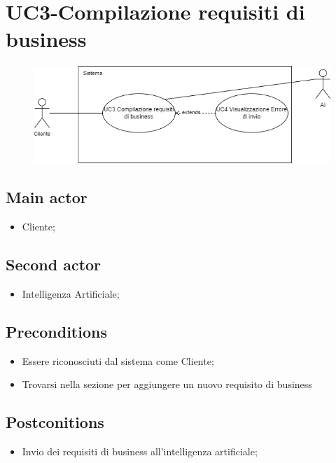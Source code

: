 \documentclass{article}
\begin{document}
    
\section{UC3-Compilazione requisiti di business}
    \begin{figure}[h]
      \centering
      \includegraphics[width=.8\textwidth, height=.6\textheight, keepaspectratio]{./imgUML/UC3.png}
      \label{fig:immagine}
    \end{figure}
     \subsection*{Main actor}
     \begin{itemize}
         \item Cliente;
     \end{itemize}
      \subsection*{Second actor}
     \begin{itemize}
         \item Intelligenza Artificiale;
     \end{itemize}
     \subsection*{Preconditions} 
     \begin{itemize}
         \item Essere riconosciuti dal sistema come Cliente;
         \item Trovarsi nella sezione per aggiungere un nuovo requisito di business
     \end{itemize}
     \subsection*{Postconitions} 
        \begin{itemize}
            \item Invio dei requisiti di business all'intelligenza artificiale;
        \end{itemize}
        
\end{document}
